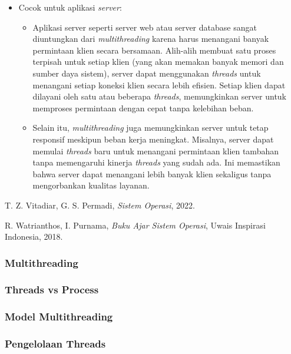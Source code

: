 \documentclass[12pt]{article}
\begin{document}
\begin{itemize}
    \item Cocok untuk aplikasi \textit{server}:
    \begin{itemize}
        \item Aplikasi server seperti server web atau server database sangat diuntungkan dari \textit{multithreading} karena harus menangani banyak permintaan klien secara bersamaan. Alih-alih membuat satu proses terpisah untuk setiap klien (yang akan memakan banyak memori dan sumber daya sistem), server dapat menggunakan \textit{threads} untuk menangani setiap koneksi klien secara lebih efisien. Setiap klien dapat dilayani oleh satu atau beberapa \textit{threads}, memungkinkan server untuk memproses permintaan dengan cepat tanpa kelebihan beban.
        \item Selain itu, \textit{multithreading} juga memungkinkan server untuk tetap responsif meskipun beban kerja meningkat. Misalnya, server dapat memulai \textit{threads} baru untuk menangani permintaan klien tambahan tanpa memengaruhi kinerja \textit{threads} yang sudah ada. Ini memastikan bahwa server dapat menangani lebih banyak klien sekaligus tanpa mengorbankan kualitas layanan.
    \end{itemize}
\end{itemize}
\begin{thebibliography}{99}

T. Z. Vitadiar, G. S. Permadi, \textit{Sistem Operasi}, 2022.

R. Watrianthos, I. Purnama, \textit{Buku Ajar Sistem Operasi}, Uwais Inspirasi Indonesia, 2018.

\end{thebibliography}



\subsubsection{Multithreading}
\subsubsection{Threads vs Process}
\subsubsection{Model Multithreading}
\subsubsection{Pengelolaan Threads}
\end{document}
